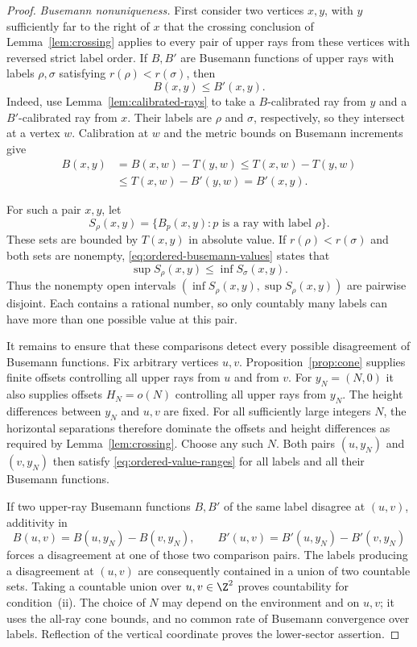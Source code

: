 \begin{proof}
\emph{Busemann nonuniqueness.}
First consider two vertices $x,y$, with $y$ sufficiently far to the
right of $x$ that the crossing conclusion of
Lemma~\ref{lem:crossing} applies to every pair of upper rays from
these vertices with reversed strict label order.  If $B,B'$ are
Busemann functions of upper rays with labels $\rho,\sigma$ satisfying
$r(\rho)<r(\sigma)$, then
\begin{equation}
 B(x,y)\le B'(x,y).
 \label{eq:ordered-busemann-values}
\end{equation}
Indeed, use Lemma~\ref{lem:calibrated-rays} to take a $B$-calibrated
ray from $y$ and a $B'$-calibrated ray from $x$.  Their labels are
$\rho$ and $\sigma$, respectively, so they intersect at a vertex
$w$.  Calibration at $w$ and the metric bounds on Busemann increments
give
\begin{align*}
 B(x,y)&=B(x,w)-T(y,w)\le T(x,w)-T(y,w)\\
       &\le T(x,w)-B'(y,w)=B'(x,y).
\end{align*}

For such a pair $x,y$, let
\[
 S_\rho(x,y)=\{B_p(x,y):p\text{ is a ray with label }\rho\}.
\]
These sets are bounded by $T(x,y)$ in absolute value.  If
$r(\rho)<r(\sigma)$ and both sets are nonempty,
\eqref{eq:ordered-busemann-values} states that
\begin{equation}
 \sup S_\rho(x,y)\le\inf S_\sigma(x,y).
 \label{eq:ordered-value-ranges}
\end{equation}
Thus the nonempty open intervals
$(\inf S_\rho(x,y),\sup S_\rho(x,y))$ are pairwise disjoint.  Each
contains a rational number, so only countably many labels can have
more than one possible value at this pair.

It remains to ensure that these comparisons detect every possible
disagreement of Busemann functions.  Fix arbitrary vertices $u,v$.
Proposition~\ref{prop:cone} supplies finite offsets controlling all
upper rays from $u$ and from $v$.  For $y_N=(N,0)$ it also supplies
offsets $H_N=o(N)$ controlling all upper rays from $y_N$.  The height
differences between $y_N$ and $u,v$ are fixed.  For all sufficiently
large integers $N$, the horizontal separations therefore dominate
the offsets and height differences as required by
Lemma~\ref{lem:crossing}.  Choose any such $N$.  Both pairs $(u,y_N)$
and $(v,y_N)$ then satisfy \eqref{eq:ordered-value-ranges} for all
labels and all their Busemann functions.

If two upper-ray Busemann functions $B,B'$ of the same label disagree
at $(u,v)$, additivity in
\[
 B(u,v)=B(u,y_N)-B(v,y_N),\qquad
 B'(u,v)=B'(u,y_N)-B'(v,y_N)
\]
forces a disagreement at one of those two comparison pairs.  The
labels producing a disagreement at $(u,v)$ are consequently contained
in a union of two countable sets.  Taking a countable union over
$u,v\in\Z^2$ proves countability for condition~(ii).  The choice of
$N$ may depend on the environment and on $u,v$; it uses the all-ray
cone bounds, and no common rate of Busemann convergence over labels.
Reflection of the vertical coordinate proves the lower-sector
assertion.
\end{proof}

